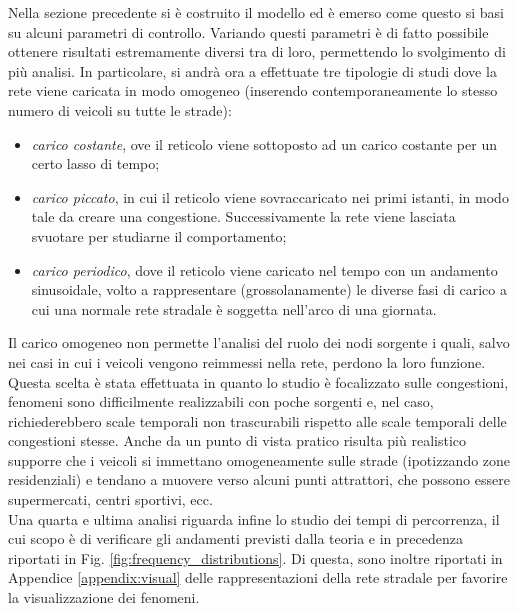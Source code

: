 \documentclass[../main.tex]{subfiles}
\begin{document}
Nella sezione precedente si \`e costruito il modello ed \`e emerso come questo si basi su alcuni parametri di controllo.
Variando questi parametri \`e di fatto possibile ottenere risultati estremamente diversi tra di loro, permettendo lo svolgimento di pi\`u analisi.
In particolare, si andr\`a ora a effettuate tre tipologie di studi dove la rete viene caricata in modo omogeneo (inserendo contemporaneamente lo stesso numero di veicoli su tutte le strade):
\begin{itemize}
    \item \emph{carico costante}, ove il reticolo viene sottoposto ad un carico costante per un certo lasso di tempo;
    \item \emph{carico piccato}, in cui il reticolo viene sovraccaricato nei primi istanti, in modo tale da creare una congestione. Successivamente la rete viene lasciata svuotare per studiarne il comportamento;
    \item \emph{carico periodico}, dove il reticolo viene caricato nel tempo con un andamento sinusoidale, volto a rappresentare (grossolanamente) le diverse fasi di carico a cui una normale rete stradale \`e soggetta nell'arco di una giornata.
\end{itemize}
Il carico omogeneo non permette l'analisi del ruolo dei nodi sorgente i quali, salvo nei casi in cui i veicoli vengono reimmessi nella rete, perdono la loro funzione.
Questa scelta \`e stata effettuata in quanto lo studio \`e focalizzato sulle congestioni, fenomeni sono difficilmente realizzabili con poche sorgenti e, nel caso, richiederebbero scale temporali non trascurabili rispetto alle scale temporali delle congestioni stesse.
Anche da un punto di vista pratico risulta pi\`u realistico supporre che i veicoli si immettano omogeneamente sulle strade (ipotizzando zone residenziali) e tendano a muovere verso alcuni punti attrattori, che possono essere supermercati, centri sportivi, ecc.\\
Una quarta e ultima analisi riguarda infine lo studio dei tempi di percorrenza, il cui scopo \`e di verificare gli andamenti previsti dalla teoria e in precedenza riportati in Fig. \ref{fig:frequency_distributions}.
Di questa, sono inoltre riportati in Appendice \ref{appendix:visual} delle rappresentazioni della rete stradale per favorire la visualizzazione dei fenomeni.
\end{document}
